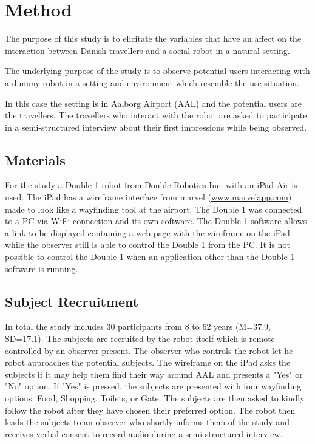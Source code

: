 \section{Method}
\label{Method}
%
The purpose of this study is to elicitate the variables that have an affect on the interaction between Danish travellers and a social robot in a natural setting. 


The underlying purpose of the study is to observe potential users interacting with a dummy robot in a setting and environment which resemble the use situation. 



In this case the setting is in Aalborg Airport (AAL) and the potential users are the travellers. The travellers who interact with the robot are asked to participate in a semi-structured interview about their first impressions while being observed. 

\subsection{Materials}
For the study a Double 1 robot from Double Robotics Inc. with an iPad Air is used. The iPad has a wireframe interface from marvel (\url{www.marvelapp.com}) made to look like a wayfinding tool at the airport. The Double 1 was connected to a PC via WiFi connection and its own software. The Double 1 software allows a link to be displayed containing a web-page with the wireframe on the iPad while the observer still is able to control the Double 1 from the PC. It is not possible to control the Double 1 when an application other than the Double 1 software is running.

\subsection{Subject Recruitment}
In total the study includes 30 participants from 8 to 62 years (M=37.9, SD=17.1). The subjects are recruited by the robot itself which is remote controlled by an observer present. The observer who controls the robot let he robot approaches the potential subjects. The wireframe on the iPad asks the subjects if it may help them find their way around AAL and presents a "Yes" or "No" option. If "Yes" is pressed, the subjects are presented with four wayfinding options: Food, Shopping, Toilets, or Gate. The subjects are then asked to kindly follow the robot after they have chosen their preferred option. The robot then leads the subjects to an observer who shortly informs them of the study and receives verbal consent to record audio during a semi-structured interview.
 
